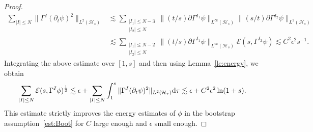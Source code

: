 \documentclass[a4paper,reqno]{amsart}
\theoremstyle{definition}
\numberwithin{equation}{section}
\def \d {{\rm{d}}}
\def \pt{\partial_{t}}
\begin{document}
\begin{proof}
\begin{equation*}
\begin{aligned}
    \sum_{|I|\le N}\|\Gamma^{I}(\pt \psi)^{2}\|_{L^{2}(\mathcal{H}_{s})}
    &\lesssim \sum_{\substack{|I_{1}|\le N-3\\ |I_{2}|\le N}}
    \|(t/s)\partial\Gamma^{I_{1}}\psi\|_{L^{\infty}(\mathcal{H}_{s})}\|(s/t)\partial\Gamma^{I_{2}}\psi\|_{L^{2}(\mathcal{H}_{s})}\\
    &\lesssim \sum_{\substack{|I_{1}|\le N-2\\ |I_{2}|\le N}}
    \|(t/s)\partial\Gamma^{I_{1}}\psi\|_{L^{\infty}(\mathcal{H}_{s})}\mathcal{E}(s,\Gamma^{I_{2}}\psi)\lesssim C^{2}\epsilon^{2}s^{-1}.
    \end{aligned}
\end{equation*}
Integrating the above estimate over $[1,s]$ and then using Lemma~\ref{le:energy}, we obtain
\begin{equation*}
    \sum_{|I|\le N}\mathcal{E}(s,\Gamma^{I}\phi)^{\frac{1}{2}}
    \lesssim  \epsilon
    +\sum_{|I|\le N}\int_{1}^{s}\|\Gamma^{I}(\pt \psi)^{2}\|_{L^{2}(\mathcal{H}_{\tau})}\d \tau
    \lesssim
    \epsilon+C^{2}\epsilon^{2}\ln (1+s).
\end{equation*}
This estimate strictly improves the energy estimates of $\phi$ in the bootstrap assumption~\eqref{est:Boot} for $C$ large enough and $\epsilon$ small enough.


\end{proof}
\end{document}
